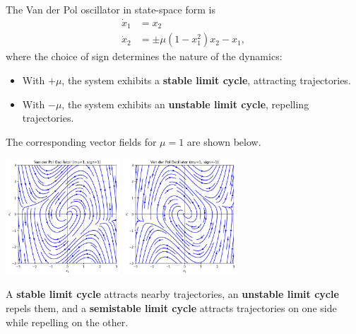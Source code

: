 \begin{example}
    The Van der Pol oscillator in state-space form is
    \begin{align}
        \dot{x}_1 &= x_2 \\
        \dot{x}_2 &= \pm \mu (1-x_1^2)x_2 - x_1,
    \end{align}
    where the choice of sign determines the nature of the dynamics:
    \begin{itemize}
        \item With $+\mu$, the system exhibits a \textbf{stable limit cycle}, attracting trajectories.  
        \item With $-\mu$, the system exhibits an \textbf{unstable limit cycle}, repelling trajectories.  
    \end{itemize}

    The corresponding vector fields for $\mu=1$ are shown below.
    
        \centering
        \includegraphics[width=0.32\textwidth]{Images/nonlinear/introduction/vdp_stable.png}
        \includegraphics[width=0.32\textwidth]{Images/nonlinear/introduction/vdp_unstable.png}
\end{example}



\begin{remark}
A \textbf{stable limit cycle} attracts nearby trajectories, an \textbf{unstable limit cycle} repels them, and a \textbf{semistable limit cycle} attracts trajectories on one side while repelling on the other. 
\end{remark}

